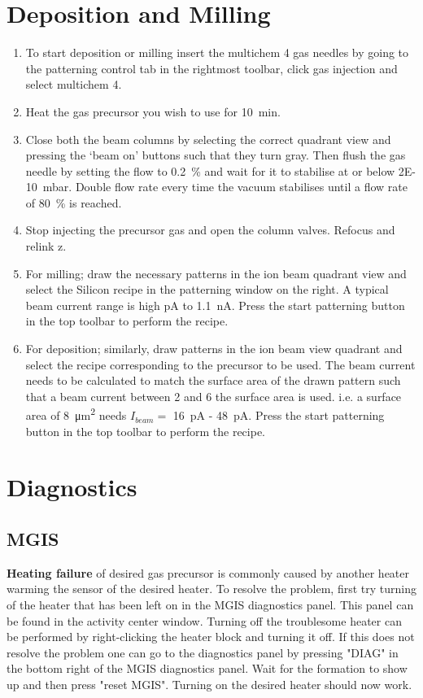 \documentclass[a4paper]{scrartcl}
\begin{document}
\section*{Deposition and Milling}
\begin{enumerate}
	\item To start deposition or milling insert the multichem 4 gas needles by going to the patterning control tab in the rightmost toolbar, click gas injection and select multichem 4.
	\item Heat the gas precursor you wish to use for \SI{10}{\minute}.
	\item Close both the beam columns by selecting the correct quadrant view and pressing the `beam on' buttons such that they turn gray. Then flush the gas needle by setting the flow to \SI{0.2}{\percent} and wait for it to stabilise at or below \SI{2E-10}{\milli \bar}. Double flow rate every time the vacuum stabilises until a flow rate of \SI{80}{\percent} is reached.
	\item Stop injecting the precursor gas and open the column valves. Refocus and relink z.
	\item For milling; draw the necessary patterns in the ion beam quadrant view and select the Silicon recipe in the patterning window on the right. A typical beam current range is high \si{\pico \ampere} to \SI{1.1}{\nano \ampere}. Press the start patterning button in the top toolbar to perform the recipe.
	\item For deposition; similarly, draw patterns in the ion beam view quadrant and select the recipe corresponding to the precursor to be used. The beam current needs to be calculated to match the surface area of the drawn pattern such that a beam current between \SI{2}{\times} and \SI{6}{\times} the surface area is used. i.e. a surface area of \SI{8}{\micro \meter \squared} needs $I_{beam}=$ \SI{16}{\pico \ampere} - \SI{48}{\pico \ampere}. Press the start patterning button in the top toolbar to perform the recipe.
\end{enumerate}

\section*{Diagnostics}
\subsection*{MGIS}
\textbf{Heating failure} of desired gas precursor is commonly caused by another heater warming the sensor of the desired heater. To resolve the problem, first try turning of the heater that has been left on in the MGIS diagnostics panel. This panel can be found in the activity center window. Turning off the troublesome heater can be performed by right-clicking the heater block and turning it off. If this does not resolve the problem one can go to the diagnostics panel by pressing "DIAG" in the bottom right of the MGIS diagnostics panel. Wait for the formation to show up and then press "reset MGIS". Turning on the desired heater should now work.
\end{document}
